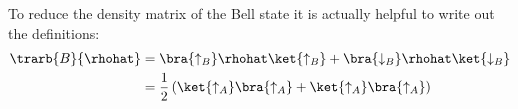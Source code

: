 To reduce the density matrix of the Bell state it is actually helpful to write out the definitions:
\begin{align}
\trarb{B}{\rhohat} &= \bra{\uparrow_B}\rhohat\ket{\uparrow_B}+\bra{\downarrow_B}\rhohat\ket{\downarrow_B}\\
&=\frac{1}{2}\left(\ket{\uparrow_A}\bra{\uparrow_A}+\ket{\uparrow_A}\bra{\uparrow_A}\right)
\end{align}